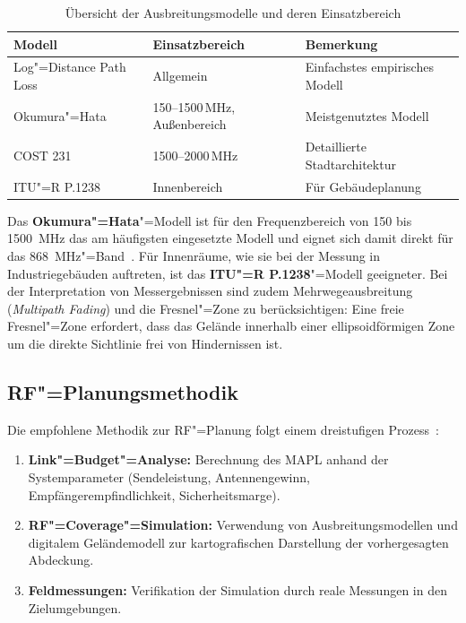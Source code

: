 \begin{table}[htbp]
  \centering
  \caption{Übersicht der Ausbreitungsmodelle und deren Einsatzbereich}
  \label{tab:ausbreitungsmodelle}
  \begin{tabular}{@{}lll@{}}
    \toprule
    \textbf{Modell} & \textbf{Einsatzbereich} & \textbf{Bemerkung} \\
    \midrule
    Log"=Distance Path Loss & Allgemein & Einfachstes empirisches Modell \\
    Okumura"=Hata            & 150--1500\,MHz, Außenbereich & Meistgenutztes Modell \\
    COST 231                 & 1500--2000\,MHz              & Detaillierte Stadtarchitektur \\
    ITU"=R P.1238            & Innenbereich                 & Für Gebäudeplanung \\
    \bottomrule
  \end{tabular}
\end{table}

Das \textbf{Okumura"=Hata}"=Modell ist für den Frequenzbereich von 150 bis
\SI{1500}{\MHz} das am häufigsten eingesetzte Modell und eignet sich damit direkt für
das \SI{868}{\MHz}"=Band~\cite{haslett2008essentials}. Für Innenräume, wie sie
bei der Messung in Industriegebäuden auftreten, ist das \textbf{ITU"=R P.1238}"=Modell
geeigneter. Bei der Interpretation von Messergebnissen sind zudem
Mehrwegeausbreitung (\textit{Multipath Fading}) und die Fresnel"=Zone zu
berücksichtigen: Eine freie Fresnel"=Zone erfordert, dass das Gelände innerhalb einer
ellipsoidförmigen Zone um die direkte Sichtlinie frei von Hindernissen ist.

\subsection{RF"=Planungsmethodik}
\label{subsec:rf-methodik}

Die empfohlene Methodik zur RF"=Planung folgt einem dreistufigen Prozess~\cite{haslett2008essentials}:

\begin{enumerate}
  \item \textbf{Link"=Budget"=Analyse:} Berechnung des MAPL anhand der Systemparameter
        (Sendeleistung, Antennengewinn, Empfängerempfindlichkeit, Sicherheitsmarge).
  \item \textbf{RF"=Coverage"=Simulation:} Verwendung von Ausbreitungsmodellen und
        digitalem Geländemodell zur kartografischen Darstellung der vorhergesagten Abdeckung.
  \item \textbf{Feldmessungen:} Verifikation der Simulation durch reale Messungen in den
        Zielumgebungen.
\end{enumerate}

